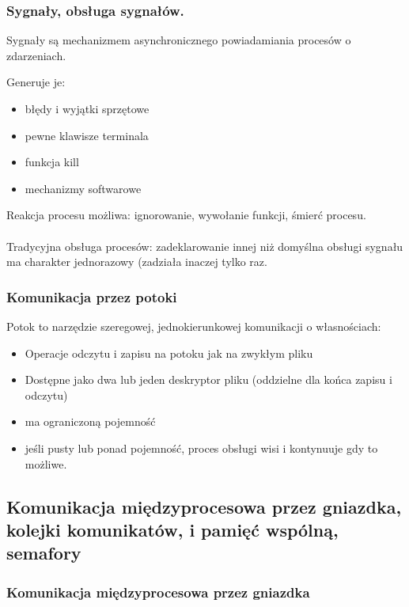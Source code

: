 \documentclass[a4paper,twoside]{report}
\begin{document}
\subsubsection{Sygnały, obsługa sygnałów.}

Sygnały są mechanizmem asynchronicznego powiadamiania procesów o zdarzeniach. 

Generuje je:
\begin{itemize}
	\item błędy i wyjątki sprzętowe
	\item pewne klawisze terminala
	\item funkcja kill
	\item mechanizmy softwarowe
\end{itemize}

Reakcja procesu możliwa: ignorowanie, wywołanie funkcji, śmierć procesu.\\
\\
Tradycyjna obsługa procesów: zadeklarowanie innej niż domyślna obsługi sygnału ma charakter jednorazowy (zadziała inaczej tylko raz.

\subsubsection{Komunikacja przez potoki}

Potok to narzędzie szeregowej, jednokierunkowej komunikacji o własnościach:
\begin{itemize}
	\item Operacje odczytu i zapisu na potoku jak na zwykłym pliku
	\item Dostępne jako dwa lub jeden deskryptor pliku (oddzielne dla końca zapisu i odczytu)
	\item ma ograniczoną pojemność
	\item jeśli pusty lub ponad pojemność, proces obsługi wisi i kontynuuje gdy to możliwe.
	
\end{itemize}

\subsection{Komunikacja międzyprocesowa przez gniazdka, kolejki komunikatów, i pamięć wspólną, semafory}  

\subsubsection{Komunikacja międzyprocesowa przez gniazdka}
\end{document}
